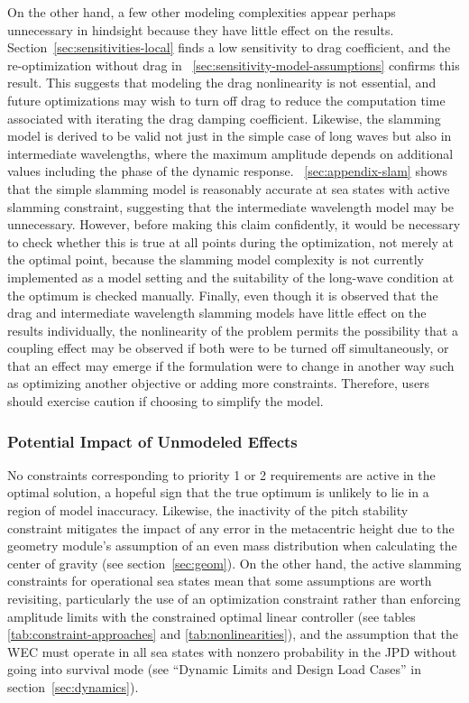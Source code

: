 On the other hand, a few other modeling complexities appear perhaps unnecessary in hindsight because they have little effect on the results.
Section~\ref{sec:sensitivities-local} finds a low sensitivity to drag coefficient, and the re-optimization without drag in \sectionautorefname~\ref{sec:sensitivity-model-assumptions} confirms this result.%
This suggests that modeling the drag nonlinearity is not essential, and future optimizations may wish to turn off drag to reduce the computation time associated with iterating the drag damping coefficient.
Likewise, the slamming model is derived to be valid not just in the simple case of long waves but also in intermediate wavelengths, where the maximum amplitude depends on additional values including the phase of the dynamic response.
\appendixautorefname~\ref{sec:appendix-slam} shows that the simple slamming model is reasonably accurate at sea states with active slamming constraint, suggesting that the intermediate wavelength model may be unnecessary.
However, before making this claim confidently, it would be necessary to check whether this is true at all points during the optimization, not merely at the optimal point, because the slamming model complexity is not currently implemented as a model setting and the suitability of the long-wave condition at the optimum is checked manually. %
Finally, even though it is observed that the drag and intermediate wavelength slamming models have little effect on the results individually, the nonlinearity of the problem permits the possibility that a coupling effect may be observed if both were to be turned off simultaneously, or that an effect may emerge if the formulation were to change in another way such as optimizing another objective or adding more constraints.
Therefore, users should exercise caution if choosing to simplify the model.

\subsubsection{Potential Impact of Unmodeled Effects}
No constraints corresponding to priority 1 or 2 requirements are active in the optimal solution, %
a hopeful sign that the true optimum is unlikely to lie in a region of model inaccuracy.
Likewise, the inactivity of the pitch stability constraint mitigates the impact of any error in the metacentric height due to the geometry module's assumption of an even mass distribution when calculating the center of gravity (see section~\ref{sec:geom}).
On the other hand, the active slamming constraints for operational sea states mean that some assumptions are worth revisiting, particularly the use of an optimization constraint rather than enforcing amplitude limits with the constrained optimal linear controller (see tables \ref{tab:constraint-approaches} and \ref{tab:nonlinearities}), and the assumption that the WEC must operate in all sea states with nonzero probability in the JPD without going into survival mode (see ``Dynamic Limits and Design Load Cases'' in section~\ref{sec:dynamics}).

